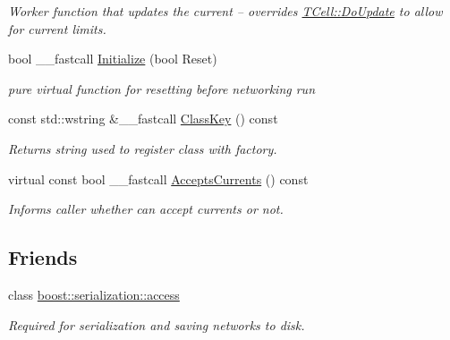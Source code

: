 \begin{DoxyCompactItemize}
\begin{DoxyCompactList}\small\item\em Worker function that updates the current -- overrides \hyperlink{class_t_cell_a676e15babd5f58f19577a362f01400a3}{T\+Cell\+::\+Do\+Update} to allow for current limits. \end{DoxyCompactList}\item 
\hypertarget{class_t_biological_cell_af4c430a48bebb23cafd778587c82d910}{bool \+\_\+\+\_\+fastcall \hyperlink{class_t_biological_cell_af4c430a48bebb23cafd778587c82d910}{Initialize} (bool Reset)}\label{class_t_biological_cell_af4c430a48bebb23cafd778587c82d910}

\begin{DoxyCompactList}\small\item\em pure virtual function for resetting before networking run \end{DoxyCompactList}\item 
const std\+::wstring \&\+\_\+\+\_\+fastcall \hyperlink{class_t_biological_cell_a7006d17ad9b7cdfa4b637d32a3c6b0b5}{Class\+Key} () const 
\begin{DoxyCompactList}\small\item\em Returns string used to register class with factory. \end{DoxyCompactList}\item 
\hypertarget{class_t_biological_cell_ac4f22e1821048a61f0cf8df7f1f3b971}{virtual const bool \+\_\+\+\_\+fastcall \hyperlink{class_t_biological_cell_ac4f22e1821048a61f0cf8df7f1f3b971}{Accepts\+Currents} () const }\label{class_t_biological_cell_ac4f22e1821048a61f0cf8df7f1f3b971}

\begin{DoxyCompactList}\small\item\em Informs caller whether can accept currents or not. \end{DoxyCompactList}\end{DoxyCompactItemize}
\subsection*{Friends}
\begin{DoxyCompactItemize}
\item 
\hypertarget{class_t_biological_cell_ac98d07dd8f7b70e16ccb9a01abf56b9c}{class \hyperlink{class_t_biological_cell_ac98d07dd8f7b70e16ccb9a01abf56b9c}{boost\+::serialization\+::access}}\label{class_t_biological_cell_ac98d07dd8f7b70e16ccb9a01abf56b9c}

\begin{DoxyCompactList}\small\item\em Required for serialization and saving networks to disk. \end{DoxyCompactList}\end{DoxyCompactItemize}
